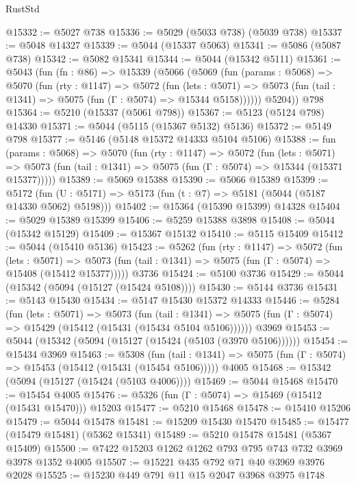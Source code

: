 \begin{lexlean}{RustStd}
\begin{coremodule}
@15332 := @5027 @738
@15336 := @5029 (@5033 @738) (@5039 @738)
@15337 := @5048 @14327
@15339 := @5044 (@15337 @5063)
@15341 := @5086 (@5087 @738)
@15342 := @5082 @15341
@15344 := @5044 (@15342 @5111)
@15361 := @5043
    (fun (fn : @86) =>
    @15339
      (@5066
        (@5069
          (fun (params : @5068) =>
          @5070
            (fun (rty : @1147) =>
            @5072
              (fun (lets : @5071) =>
              @5073 (fun (tail : @1341) => @5075 (fun (Γ : @5074) => @15344 @5158))))))
        @5204))
    @798
@15364 := @5210 (@15337 (@5061 @798))
@15367 := @5123 (@5124 @798) @14330
@15371 := @5044 (@5115 (@15367 @5132) @5136)
@15372 := @5149 @798
@15377 := @5146 (@5148 @15372 @14333 @5104 @5106)
@15388 := fun (params : @5068) =>
  @5070
    (fun (rty : @1147) =>
    @5072
      (fun (lets : @5071) =>
      @5073 (fun (tail : @1341) => @5075 (fun (Γ : @5074) => @15344 (@15371 @15377)))))
@15389 := @5069 @15388
@15390 := @5066 @15389
@15399 := @5172
    (fun (U : @5171) => @5173 (fun (t : @7) => @5181 (@5044 (@5187 @14330 @5062) @5198)))
@15402 := @15364 (@15390 @15399) @14328
@15404 := @5029 @15389 @15399
@15406 := @5259 @15388 @3898
@15408 := @5044 (@15342 @15129)
@15409 := @15367 @15132
@15410 := @5115 @15409
@15412 := @5044 (@15410 @5136)
@15423 := @5262
    (fun (rty : @1147) =>
    @5072
      (fun (lets : @5071) =>
      @5073 (fun (tail : @1341) => @5075 (fun (Γ : @5074) => @15408 (@15412 @15377)))))
    @3736
@15424 := @5100 @3736
@15429 := @5044 (@15342 (@5094 (@15127 (@15424 @5108))))
@15430 := @5144 @3736
@15431 := @5143 @15430
@15434 := @5147 @15430 @15372 @14333
@15446 := @5284
    (fun (lets : @5071) =>
    @5073
      (fun (tail : @1341) =>
      @5075 (fun (Γ : @5074) => @15429 (@15412 (@15431 (@15434 @5104 @5106))))))
    @3969
@15453 := @5044 (@15342 (@5094 (@15127 (@15424 (@5103 (@3970 @5106))))))
@15454 := @15434 @3969
@15463 := @5308
    (fun (tail : @1341) => @5075 (fun (Γ : @5074) => @15453 (@15412 (@15431 (@15454 @5106)))))
    @4005
@15468 := @15342 (@5094 (@15127 (@15424 (@5103 @4006))))
@15469 := @5044 @15468
@15470 := @15454 @4005
@15476 := @5326 (fun (Γ : @5074) => @15469 (@15412 (@15431 @15470))) @15203
@15477 := @5210 @15468
@15478 := @15410 @15206
@15479 := @5044 @15478
@15481 := @15209 @15430 @15470
@15485 := @15477 (@15479 @15481) (@5362 @15341)
@15489 := @5210 @15478 @15481 (@5367 @15409)
@15500 := @7422 @15203 @1262 @1262 @793 @795 @743 @732 @3969 @3978 @1352 @4005
@15507 := @15221 @435 @792 @71 @40 @3969 @3976 @2028
@15525 := @15230
    @449
    @791
    @11
    @15
    @2047
    @3968
    @3975
    @1748

\end{coremodule}
\end{lexlean}
